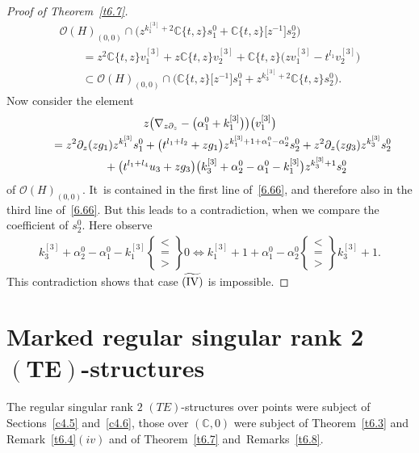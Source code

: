 \documentclass[pdftex]{sigma}%
\numberwithin{equation}{section}
\numberwithin{figure}{section}
\newcommand{\C}{{\mathbb C}}
\newcommand{\OO}{{\mathcal O}}
\newcommand{\www}{\widetilde}
\newcommand{\paa}{\partial}
\newcommand{\nnn}{\nabla}
\begin{document}
\begin{proof}[Proof of Theorem~\ref{t6.7}]
\begin{gather}
 \OO(H)_{(0,0)}\cap\bigl( z^{k_1^{[3]}+2}\C\{t,z\}s_1^0 +
\C\{t,z\}\big[z^{-1}\big]s_2^0\bigr)\nonumber
\\ \qquad
{}= z^2\C\{t,z\}v_1^{[3]} + z\C\{t,z\}v_2^{[3]} +
\C\{t,z\}\big(zv_1^{[3]}-t^{l_1}v_2^{[3]}\big)\nonumber
\\ \qquad
{}\subset \OO(H)_{(0,0)}\cap \bigl(
\C\{t,z\}\big[z^{-1}\big]s_1^0 + z^{k_3^{[3]}+2}\C\{t,z\}s_2^0\bigr).\label{6.66}
\end{gather}
Now consider the element
\begin{gather*}
z\big(\nnn_{z\paa_z}-\big(\alpha_1^0+k_1^{[3]}\big)\big)\big(v_1^{[3]}\big)
\\ \qquad
{}= z^2\paa_z(zg_1)z^{k_1^{[3]}}s_1^0
+ \big(t^{l_1+l_2}+zg_1\big)z^{k_1^{[3]}+1+\alpha_1^0-\alpha_2^0}s_2^0 + z^2\paa_z(zg_3)z^{k_3^{[3]}}s_2^0
\\ \qquad \hphantom{=}
{}
+ \big(t^{l_1+l_4}u_3+zg_3\big)\big(k_3^{[3]}+\alpha_2^0
-\alpha_1^0-k_1^{[3]}\big)z^{k_3^{[3]}+1}s_2^0
\end{gather*}
of $\OO(H)_{(0,0)}$. It~is contained in the first line of~\eqref{6.66},
and therefore also in the third line of~\eqref{6.66}.
But this leads to a contradiction, when we compare the
coefficient of $s_2^0$. Here observe
\begin{gather*}
k_3^{[3]}+\alpha_2^0-\alpha_1^0-k_1^{[3]}
\left\{\!\!\begin{array}{l}<\\=\\>\end{array}\!\!\right\} 0
\iff
k_1^{[3]}+1+\alpha_1^0-\alpha_2^0
\left\{\!\!\begin{array}{l}<\\=\\>\end{array}\!\!\right\} k_3^{[3]}+1.
\end{gather*}
This contradiction shows that case $\www{\rm (IV)}$
is impossible.
\end{proof}

\section[Marked regular singular rank 2 $(TE)$-structures]{Marked regular singular rank 2 $\boldsymbol{(TE)}$-structures}\label{c7}

The regular singular rank $2$ $(TE)$-structures over points
were subject of Sections~\ref{c4.5} and~\ref{c4.6},
those over $(\C,0)$ were subject of Theorem~\ref{t6.3}
and Remark~\ref{t6.4}$(iv)$ and of Theorem~\ref{t6.7}
and~Remarks~\ref{t6.8}.
\end{document}
